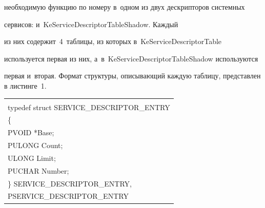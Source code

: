 необходимую функцию по номеру в~одном из двух дескрипторов системных 


сервисов: и~{\sf KeServiceDescriptorTableShadow}. Каждый 


из них содержит~4~таблицы, из которых в~{\sf KeServiceDescriptorTable} 


используется первая из них, а~в~{\sf KeServiceDescriptorTableShadow} используются 


первая и~вторая. Формат структуры, описывающий каждую таблицу, представлен в листинге~1. 


  


  \renewcommand{\tablename}{\protect\bf Листинг}


  \begin{table}[b]\small %


  \vspace*{-6pt}


  \begin{center}


  


  




  


  \begin{tabular}{|l|}


  \hline


  \\[-7pt]


{\sf typedef struct SERVICE\_DESCRIPTOR\_ENTRY}\\


\{\\


{\sf PVOID *Base};\\


{\sf PULONG Count};\\


{\sf ULONG Limit};\\


{\sf PUCHAR Number};\\


\} {\sf SERVICE\_DESCRIPTOR\_ENTRY},\\


{\sf *PSERVICE\_DESCRIPTOR\_ENTRY}\\


\hline



\end{tabular}
\end{center}
\end{table}
